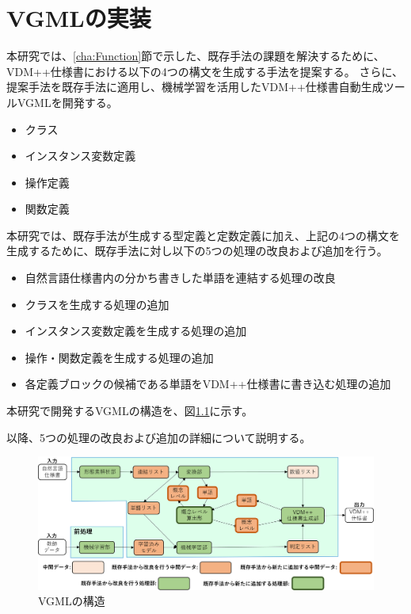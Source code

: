 \chapter{VGMLの実装}\label{cha:Implementation}

本研究では、\ref{cha:Function}節で示した、既存手法の課題を解決するために、VDM++仕様書における以下の4つの構文を生成する手法を提案する。
さらに、提案手法を既存手法に適用し、機械学習を活用したVDM++仕様書自動生成ツールVGMLを開発する。

\begin{itemize}
    \item クラス
    \item インスタンス変数定義
    \item 操作定義
    \item 関数定義
\end{itemize}

本研究では、既存手法が生成する型定義と定数定義に加え、上記の4つの構文を生成するために、既存手法に対し以下の5つの処理の改良および追加を行う。

\begin{itemize}
    \item 自然言語仕様書内の分かち書きした単語を連結する処理の改良
    \item クラスを生成する処理の追加
    \item インスタンス変数定義を生成する処理の追加
    \item 操作・関数定義を生成する処理の追加
    \item 各定義ブロックの候補である単語をVDM++仕様書に書き込む処理の追加
\end{itemize}

本研究で開発するVGMLの構造を、図\ref{fig:vgml_structure}に示す。

以降、5つの処理の改良および追加の詳細について説明する。

\begin{figure}[t]
    \begin{center}
        \includegraphics[width=1.0\columnwidth]{image/vgml_structure.png}
        \caption{VGMLの構造}
        \label{fig:vgml_structure}
    \end{center}
\end{figure}

